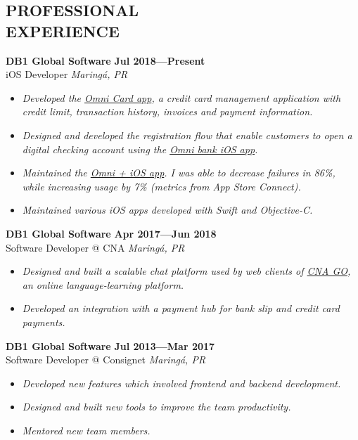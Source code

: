 \documentclass[line,margin]{res}
\begin{document}


\address{\sl \href{https://marcosatanaka.com}{marcosatanaka.com} --- \href{mailto:marcosatanaka@gmail.com}{marcosatanaka@gmail.com}}


\begin{resume}


\section{PROFESSIONAL \\ EXPERIENCE}
  {\bf DB1 Global Software} \hfill {\bf Jul 2018---Present} \\
  iOS Developer \hfill {\sl Maring\'a, PR}\\[-6pt]
  \begin{itemize}
    \item {\sl Developed the \href{https://apps.apple.com/us/app/id1490242421}{Omni Card app}, a credit card management application with credit limit, transaction history, invoices and payment information.}
    \item {\sl Designed and developed the registration flow that enable customers to open a digital checking account using the \href{https://apps.apple.com/br/app/omni-banco/id1369601365}{Omni bank iOS app}.}
    \item {\sl Maintained the \href{https://apps.apple.com/br/app/omni/id1276332750}{Omni + iOS app}. I was able to decrease failures in 86\%, while increasing usage by 7\% (metrics from App Store Connect).}
    \item {\sl Maintained various iOS apps developed with Swift and Objective-C.}
  \end{itemize}

  {\bf DB1 Global Software} \hfill {\bf Apr 2017---Jun 2018} \\
  Software Developer @ CNA \hfill {\sl Maring\'a, PR}\\[-6pt]
  \begin{itemize}
    \item {\sl Designed and built a scalable chat platform used by web clients of \href{https://www.cnago.com.br}{CNA GO}, an online language-learning platform.}
    \item {\sl Developed an integration with a payment hub for
               bank slip and credit card payments.}
  \end{itemize}

  {\bf DB1 Global Software} \hfill {\bf Jul 2013---Mar 2017} \\
  Software Developer @ Consignet \hfill {\sl Maring\'a, PR}\\[-6pt]
  \begin{itemize}
    \item {\sl Developed new features which involved
               frontend and backend development.}
    \item {\sl Designed and built new tools to improve the team productivity.}
    \item {\sl Mentored new team members.}
  \end{itemize}


\end{resume}
\end{document}
